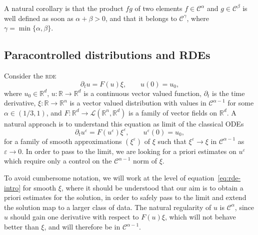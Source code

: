\documentclass[a4paper,11pt]{article}
\theoremstyle{remark}
\newcommand{\R}{\mathbb{R}}
\newcommand{\Lcal}{\mathcal{L}}
\newcommand{\CC}{\ensuremath{\mathscr{C}}}
\begin{document}
A natural corollary is that the product $fg$ of two elements $f \in \CC^{\alpha}$ and $g \in \CC^{\beta}$ is well defined as soon as $\alpha + \beta >0$, and that it belongs to $\CC^{\gamma}$, where $\gamma = \min \{\alpha , \beta\}$.


\subsection{Paracontrolled distributions and RDEs}\label{sec:paracontrolled ode}

Consider the \textsc{rde}
\begin{equation}\label{eq:rde-intro} 
  \partial_{t} u=F ( u ) \xi, \qquad u(0) = u_0,
\end{equation}
where $u_0 \in \R^d$, $u\colon \mathbb{R} \rightarrow \mathbb{R}^{d}$ is a continuous vector
valued function, $\partial_{t}$ is the time derivative, $\xi\colon \mathbb{R} \rightarrow \mathbb{R}^{n}$ is a vector valued distribution with values in
$\CC^{\alpha -1}$ for some $\alpha \in ( 1/3,1 )$, and
$F\colon \mathbb{R}^{d} \rightarrow \Lcal ( \mathbb{R}^{n} ,\mathbb{R}^{d})$ is a family of vector fields on $\mathbb{R}^{d}$. A natural approach is to
understand this equation as limit of the classical ODEs
\begin{equation}\label{eq:rde-reg-intro}
  \partial_{t} u^{\varepsilon} = F ( u^{\varepsilon} ) \xi^{\varepsilon}, \qquad u^\varepsilon(0) = u_0,
\end{equation}
for a family of smooth approximations $(\xi^{\varepsilon})$ of $\xi$ such that
$\xi^{\varepsilon} \rightarrow \xi$ in $\CC^{\alpha -1}$ as $\varepsilon \rightarrow 0$. In order to pass to the limit, we are looking for a
priori estimates on $u^{\varepsilon}$ which require only a control on the
$\CC^{\alpha -1}$ norm of $\xi$.

To avoid cumbersome notation, we will work at the level of
equation~{\eqref{eq:rde-intro}} for smooth $\xi$, where it should be understood that
our aim is to obtain a priori estimates for the solution, in order to safely pass
to the limit and extend the solution map to a larger class of data. The
natural regularity of $u$ is $\CC^{\alpha}$, since $u$ should gain one
derivative with respect to $F ( u ) \xi$, which will not behave better than
$\xi$, and will therefore be in $\CC^{\alpha -1}$.
\end{document}
